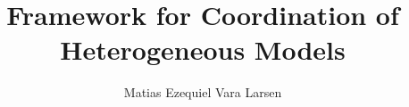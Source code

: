 \documentclass[a4paper,12pt,twoside]{report}
\begin{document}
\title{\LARGE {\bf Framework for Coordination of Heterogeneous Models}\\
 \vspace*{6mm}
}

\author{Matias Ezequiel Vara Larsen}

\normallinespacing
\maketitle

\preface





\body









\appendix





\end{document}
